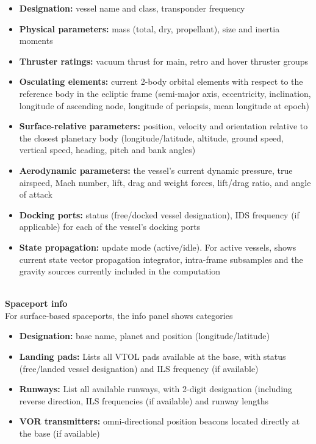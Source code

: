 \documentclass[Orbiter User Manual.tex]{subfiles}
\begin{document}
\begin{figure}[H]
	\centering
\end{figure}

\noindent
\begin{itemize}
\item \textbf{Designation:} vessel name and class, transponder frequency
\item \textbf{Physical parameters:} mass (total, dry, propellant), size and inertia moments
\item \textbf{Thruster ratings:} vacuum thrust for main, retro and hover thruster groups
\item \textbf{Osculating elements:} current 2-body orbital elements with respect to the reference body in the ecliptic frame (semi-major axis, eccentricity, inclination, longitude of ascending node, longitude of periapsis, mean longitude at epoch)
\item \textbf{Surface-relative parameters:} position, velocity and orientation relative to the closest planetary body (longitude/latitude, altitude, ground speed, vertical speed, heading, pitch and bank angles)
\item \textbf{Aerodynamic parameters:} the vessel’s current dynamic pressure, true airspeed, Mach number, lift, drag and weight forces, lift/drag ratio, and angle of attack
\item \textbf{Docking ports:} status (free/docked vessel designation), IDS frequency (if applicable) for each of the vessel’s docking ports
\item \textbf{State propagation:} update mode (active/idle). For active vessels, shows current state vector propagation integrator, intra-frame subsamples and the gravity sources currently included in the computation
\end{itemize}

\noindent
\\
\textbf{Spaceport info}\\
For surface-based spaceports, the info panel shows categories

\begin{figure}[H]
	\centering
\end{figure}

\noindent
\begin{itemize}
\item \textbf{Designation:} base name, planet and position (longitude/latitude)
\item \textbf{Landing pads:} Lists all VTOL pads available at the base, with status (free/landed vessel designation) and ILS frequency (if available)
\item \textbf{Runways:} List all available runways, with 2-digit designation (including reverse direction, ILS frequencies (if available) and runway lengths
\item \textbf{VOR transmitters:} omni-directional position beacons located directly at the base (if available)
\end{itemize}
\end{document}
